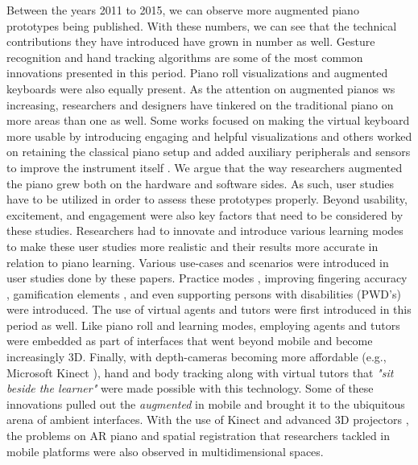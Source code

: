 \documentclass[sigconf, screen, review]{acmart}
\begin{document}
Between the years 2011 to 2015, we can observe more augmented piano prototypes being published. With these numbers, we can see that the technical contributions they have introduced have grown in number as well. Gesture recognition and hand tracking algorithms are some of the most common innovations presented in this period. Piano roll visualizations and augmented keyboards were also equally present. %
As the attention on augmented pianos ws increasing, researchers and designers have tinkered on the traditional piano on more areas than one as well. Some works focused on making the virtual keyboard more usable by introducing engaging and helpful visualizations \cite{huang2011piano, xiao2011duet, xiao2013mirrorfugue, xiao2014andante, weing2013piano, chow2013music} and others worked on retaining the classical piano setup and added auxiliary peripherals and sensors to improve the instrument itself \cite{mcpherson2013portable, mcpherson2015buttons, takegawa2012piano, oka2013marker, goodwin2013key, fontana2015designing, dahlstedt2015mapping}. We argue that the way researchers augmented the piano grew both on the hardware and software sides. As such, user studies have to be utilized in order to assess these prototypes properly. Beyond usability, excitement, and engagement were also key factors that need to be considered by these studies. Researchers had to innovate and introduce various learning modes to make these user studies more realistic and their results more accurate in relation to piano learning. Various use-cases and scenarios were introduced in user studies done by these papers. Practice modes \cite{}, improving fingering accuracy \cite{goodwin2013key, xiao2011duet}, gamification elements \cite{weing2013piano,raymaekers2014game}, and even supporting persons with disabilities (PWD's) \cite{chouvatut2013virtual} were introduced. The use of virtual agents and tutors were first introduced in this period as well. Like piano roll and learning modes, employing agents and tutors were embedded as part of interfaces that went beyond mobile and become increasingly 3D. Finally, with depth-cameras becoming more affordable (e.g., Microsoft Kinect \cite{zhang2012microsoft}), hand and body tracking along with virtual tutors that \textit{"sit beside the learner"} were made possible with this technology. Some of these innovations pulled out the \textit{augmented} in mobile and brought it to the ubiquitous arena of ambient interfaces. With the use of Kinect and advanced 3D projectors \cite{yang2012augmented}, the problems on AR piano and spatial registration that researchers tackled in mobile platforms were also observed in multidimensional spaces. 
\end{document}
